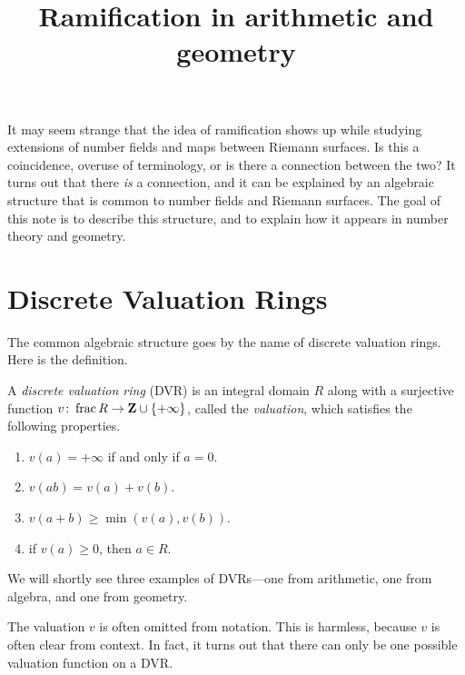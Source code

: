 \documentclass[12pt]{article}
\title{Ramification in arithmetic and geometry}
\DeclareMathOperator{\f}{frac}
\begin{document}
\maketitle

It may seem strange that the idea of ramification shows up while studying extensions of number fields and maps between Riemann surfaces.
Is this a coincidence, overuse of terminology, or is there a connection between the two?
It turns out that there \emph{is} a connection, and it can be explained by an algebraic structure that is common to number fields and Riemann surfaces.
The goal of this note is to describe this structure, and to explain how it appears in number theory and geometry.

\section{Discrete Valuation Rings}
The common algebraic structure goes by the name of discrete valuation rings.
Here is the definition.
\begin{definition}
  A \emph{discrete valuation ring} (DVR) is an integral domain $R$ along with a surjective function $v \from \f R \to \Z \cup \{+\infty\}$, called the \emph{valuation}, which satisfies the following properties.
  \begin{enumerate}
  \item $v(a) = +\infty$ if and only if $a = 0$.
  \item $v(ab) = v(a) + v(b)$.
  \item $v(a+b) \geq \min(v(a), v(b))$.
  \item if $v(a) \geq 0$, then $a \in R$.
  \end{enumerate}
\end{definition}
We will shortly see three examples of DVRs---one from arithmetic, one from algebra, and one from geometry.

The valuation $v$ is often omitted from notation.
This is harmless, because $v$ is often clear from context.
In fact, it turns out that there can only be one possible valuation function on a DVR.
\end{document}
